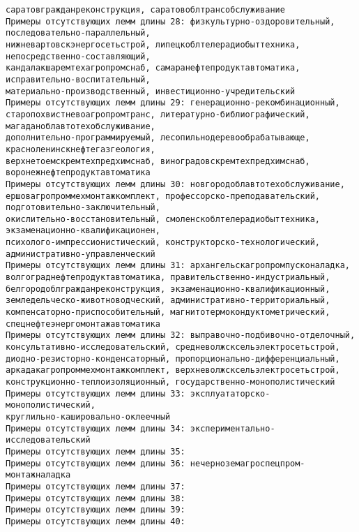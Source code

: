 \documentclass[11pt]{article}
\begin{document}
\begin{Verbatim}[commandchars=\\\{\}]
саратовгражданреконструкция, саратовоблтрансобслуживание
Примеры отсутствующих лемм длины 28: физкультурно-оздоровительный, последовательно-параллельный,
нижневартовскэнергосетьстрой, липецкоблтелерадиобыттехника, непосредственно-составляющий,
кандалакшаремтехагропромснаб, самаранефтепродуктавтоматика, исправительно-воспитательный,
материально-производственный, инвестиционно-учредительский
Примеры отсутствующих лемм длины 29: генерационно-рекомбинационный,
старопохвистневоагропромтранс, литературно-библиографический, магаданоблавтотехобслуживание,
дополнительно-программируемый, лесопильнодеревообрабатывающе, красноленинскнефтегазгеология,
верхнетоемскремтехпредхимснаб, виноградовскремтехпредхимснаб, воронежнефтепродуктавтоматика
Примеры отсутствующих лемм длины 30: новгородоблавтотехобслуживание,
ершовагропроммехмонтажкомплект, профессорско-преподавательский, подготовительно-заключительный,
окислительно-восстановительный, смоленскоблтелерадиобыттехника, экзаменационно-квалификационен,
психолого-импрессионистический, конструкторско-технологический, административно-управленческий
Примеры отсутствующих лемм длины 31: архангельскагропромпусконаладка,
волгограднефтепродуктавтоматика, правительственно-индустриальный,
белгородоблгражданреконструкция, экзаменационно-квалификационный,
земледельческо-животноводческий, административно-территориальный,
компенсаторно-приспособительный, магнитотермокондуктометрический,
спецнефтеэнергомонтажавтоматика
Примеры отсутствующих лемм длины 32: выправочно-подбивочно-отделочный,
консультативно-исследовательский, средневолжсксельэлектросетьстрой,
диодно-резисторно-конденсаторный, пропорционально-дифференциальный,
аркадакагропроммехмонтажкомплект, верхневолжсксельэлектросетьстрой,
конструкционно-теплоизоляционный, государственно-монополистический
Примеры отсутствующих лемм длины 33: эксплуататорско-монополистический,
круглильно-кашировально-оклеечный
Примеры отсутствующих лемм длины 34: экспериментально-исследовательский
Примеры отсутствующих лемм длины 35: 
Примеры отсутствующих лемм длины 36: нечерноземагроспецпром-монтажналадка
Примеры отсутствующих лемм длины 37: 
Примеры отсутствующих лемм длины 38: 
Примеры отсутствующих лемм длины 39: 
Примеры отсутствующих лемм длины 40: 

    \end{Verbatim}
\end{document}
